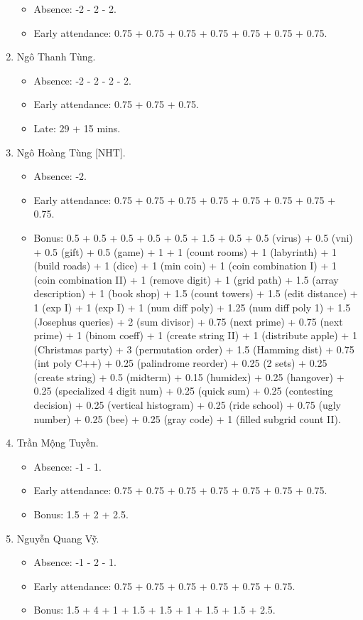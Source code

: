 \documentclass{article}
\begin{document}
\begin{enumerate}
	\begin{itemize}
		\item Absence: -2 - 2 - 2.
		\item Early attendance: 0.75 + 0.75 + 0.75 + 0.75 + 0.75 + 0.75 + 0.75.
	\end{itemize}
	\item {\sc Ngô Thanh Tùng.}
	\begin{itemize}
		\item Absence: -2 - 2 - 2 - 2.
		\item Early attendance: 0.75 + 0.75 + 0.75.
		\item Late: 29 + 15 mins.
	\end{itemize}
	\item {\sc Ngô Hoàng Tùng [NHT].}
	\begin{itemize}
        \item Absence: -2.
		\item Early attendance: 0.75 + 0.75 + 0.75 + 0.75 + 0.75 + 0.75 + 0.75 + 0.75.
		\item Bonus: 0.5 + 0.5 + 0.5 + 0.5 + 0.5 + 1.5 + 0.5 + 0.5 (virus) + 0.5 (vni) + 0.5 (gift) + 0.5 (game) + 1 + 1 (count rooms) + 1 (labyrinth) + 1 (build roads) + 1 (dice) + 1 (min coin) + 1 (coin combination I) + 1 (coin combination II) + 1 (remove digit) + 1 (grid path) + 1.5 (array description) + 1 (book shop) + 1.5 (count towers) + 1.5 (edit distance) + 1 (exp I) + 1 (exp I) + 1 (num diff poly) + 1.25 (num diff poly 1) + 1.5 (Josephus queries) + 2 (sum divisor) + 0.75 (next prime) + 0.75 (next prime) + 1 (binom coeff) + 1 (create string II) + 1 (distribute apple) + 1 (Christmas party) + 3 (permutation order) + 1.5 (Hamming dist) + 0.75 (int poly C++) + 0.25 (palindrome reorder) + 0.25 (2 sets) + 0.25 (create string) + 0.5 (midterm) + 0.15 (humidex) + 0.25 (hangover) + 0.25 (specialized 4 digit num) + 0.25 (quick sum)  + 0.25 (contesting decision) + 0.25 (vertical histogram) + 0.25 (ride school) + 0.75 (ugly number) + 0.25 (bee) + 0.25 (gray code) + 1 (filled subgrid count II).
	\end{itemize}
	\item {\sc Trần Mộng Tuyền.}
	\begin{itemize}
		\item Absence: -1 - 1.
		\item Early attendance: 0.75 + 0.75 + 0.75 + 0.75 + 0.75 + 0.75 + 0.75.
        \item Bonus: 1.5 + 2 + 2.5.
	\end{itemize}
	\item {\sc Nguyễn Quang Vỹ.}
	\begin{itemize}
		\item Absence: -1 - 2 - 1.
		\item Early attendance: 0.75 + 0.75 + 0.75 + 0.75 + 0.75 + 0.75.
		\item Bonus: 1.5 + 4 + 1 + 1.5 + 1.5 + 1 + 1.5 + 1.5 + 2.5.
	\end{itemize}
\end{enumerate}
\end{document}
